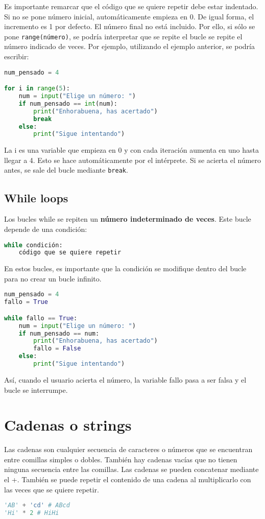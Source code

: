 Es importante remarcar que el código que se quiere repetir debe estar indentado. Si no se pone número inicial, automáticamente empieza en 0. De igual forma, el incremento es 1 por defecto. El número final no está incluido. Por ello, si sólo se pone \texttt{range(número)}, se podría interpretar que se repite el bucle se repite el número indicado de veces. Por ejemplo, utilizando el ejemplo anterior, se podría escribir:
\begin{lstlisting}[language=Python]
num_pensado = 4

for i in range(5):
	num = input("Elige un número: ")
	if num_pensado == int(num):
		print("Enhorabuena, has acertado")
		break
	else:
		print("Sigue intentando")
\end{lstlisting}

La i es una variable que empieza en 0 y con cada iteración aumenta en uno hasta llegar a 4. Esto se hace automáticamente por el intérprete. Si se acierta el número antes, se sale del bucle mediante \texttt{break}.

\subsection{While loops}
Los bucles while se repiten un \textbf{número indeterminado de veces}. Este bucle depende de una condición:
\begin{lstlisting}[language=Python]
while condición:
	código que se quiere repetir
\end{lstlisting}

En estos bucles, es importante que la condición se modifique dentro del bucle para no crear un bucle infinito. 
\begin{lstlisting}[language=Python]
num_pensado = 4
fallo = True

while fallo == True:
	num = input("Elige un número: ")
	if num_pensado == num:
		print("Enhorabuena, has acertado")
		fallo = False
	else:
		print("Sigue intentando")
\end{lstlisting}
Así, cuando el usuario acierta el número, la variable fallo pasa a ser falsa y el bucle se interrumpe.

\section{Cadenas o strings}
Las cadenas son cualquier secuencia de caracteres o números que se encuentran entre comillas simples o dobles. También hay cadenas vacías que no tienen ninguna secuencia entre las comillas. Las cadenas se pueden concatenar mediante el +. También se puede repetir el contenido de una cadena al multiplicarlo con las veces que se quiere repetir.
\begin{lstlisting}[language=Python]
'AB' + 'cd' # ABcd
'Hi' * 2 # HiHi 
\end{lstlisting}

